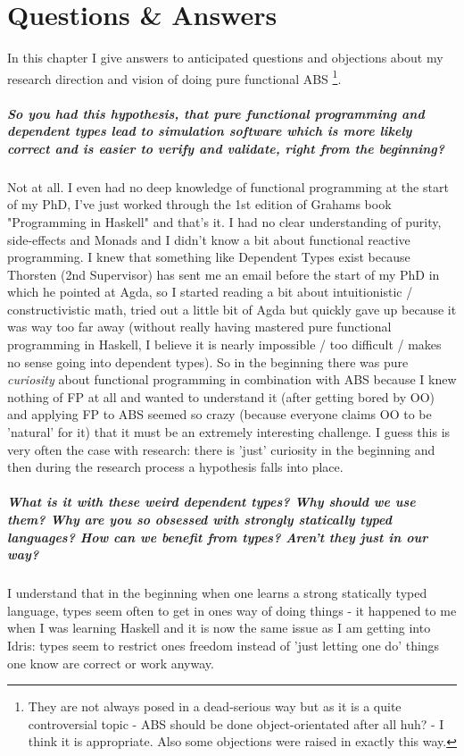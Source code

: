 \chapter{Questions \& Answers}
\label{chap:qa}

In this chapter I give answers to anticipated questions and objections about my research direction and vision of doing pure functional ABS \footnote{They are not always posed in a dead-serious way but as it is a quite controversial topic - ABS should be done object-orientated after all huh? - I think it is appropriate. Also some objections were raised in exactly this way.}.

\paragraph{So you had this hypothesis, that pure functional programming and dependent types lead to simulation software which is more likely correct and is easier to verify and validate, right from the beginning?}
Not at all. I even had no deep knowledge of functional programming at the start of my PhD, I've just worked through the 1st edition of Grahams book "Programming in Haskell" and that's it. I had no clear understanding of purity, side-effects and Monads and I didn't know a bit about functional reactive programming. I knew that something like Dependent Types exist because Thorsten (2nd Supervisor) has sent me an email before the start of my PhD in which he pointed at Agda, so I started reading a bit about intuitionistic / constructivistic math, tried out a little bit of Agda but quickly gave up because it was way too far away (without really having mastered pure functional programming in Haskell, I believe it is nearly impossible / too difficult / makes no sense going into dependent types).
So in the beginning there was pure \textit{curiosity} about functional programming in combination with ABS because I knew nothing of FP at all and wanted to understand it (after getting bored by OO) and applying FP to ABS seemed so crazy (because everyone claims OO to be 'natural' for it) that it must be an extremely interesting challenge. I guess this is very often the case with research: there is 'just' curiosity in the beginning and then during the research process a hypothesis falls into place.

\paragraph{What is it with these weird dependent types? Why should we use them? Why are you so obsessed with strongly statically typed languages? How can we benefit from types? Aren't they just in our way?}
I understand that in the beginning when one learns a strong statically typed language, types seem often to get in ones way of doing things - it happened to me when I was learning Haskell and it is now the same issue as I am getting into Idris: types seem to restrict ones freedom instead of 'just letting one do' things one know are correct or work anyway.

